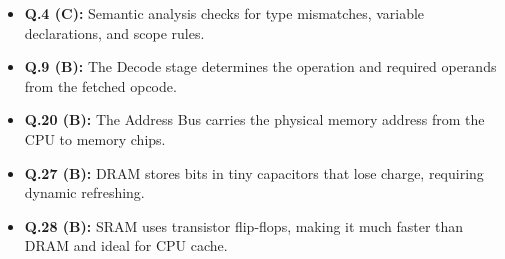 \begin{expbox}
\begin{itemize}[leftmargin=5mm]
    \item \textbf{Q.4 (C):} Semantic analysis checks for type mismatches, variable declarations, and scope rules.
    \item \textbf{Q.9 (B):} The Decode stage determines the operation and required operands from the fetched opcode.
    \item \textbf{Q.20 (B):} The Address Bus carries the physical memory address from the CPU to memory chips.
    \item \textbf{Q.27 (B):} DRAM stores bits in tiny capacitors that lose charge, requiring dynamic refreshing.
    \item \textbf{Q.28 (B):} SRAM uses transistor flip-flops, making it much faster than DRAM and ideal for CPU cache.
\end{itemize}
\end{expbox}

\newpage
